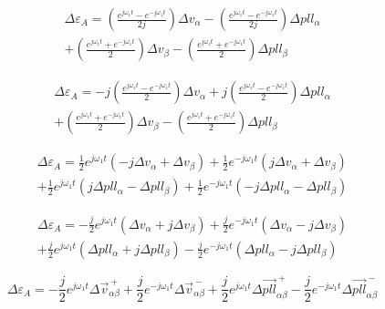 \documentclass[12pt,a4paper]{report}
\begin{document}
{

\color{blue}

\begin{multline}
\Delta\varepsilon_A =
\left(
\frac{e^{j\omega_1 t} - e^{-j\omega_1 t}}{2j}
\right) 
\Delta v_\alpha 
- \left(
\frac{e^{j\omega_1 t} - e^{-j\omega_1 t}}{2j}
\right)
\Delta pll_\alpha \\
+ \left(
\frac{e^{j\omega_1 t} + e^{-j\omega_1 t}}{2}
\right) 
\Delta v_\beta 
- \left(
\frac{e^{j\omega_1 t} + e^{-j\omega_1 t}}{2}
\right) 
\Delta pll_\beta
\end{multline}


\begin{multline}
\Delta\varepsilon_A =
-j\left(
\frac{e^{j\omega_1 t} - e^{-j\omega_1 t}}{2}
\right) 
\Delta v_\alpha 
+j \left(
\frac{e^{j\omega_1 t} - e^{-j\omega_1 t}}{2}
\right)
\Delta pll_\alpha \\
+ \left(
\frac{e^{j\omega_1 t} + e^{-j\omega_1 t}}{2}
\right) 
\Delta v_\beta 
- \left(
\frac{e^{j\omega_1 t} + e^{-j\omega_1 t}}{2}
\right) 
\Delta pll_\beta
\end{multline}


\begin{multline}
\Delta\varepsilon_A =
\frac{1}{2}
e^{j\omega_1 t}
( -j \Delta v_{\alpha}  + \Delta v_{\beta} )
+\frac{1}{2}
e^{-j\omega_1 t}
( j \Delta v_{\alpha}  + \Delta v_{\beta} )\\
+\frac{1}{2}
e^{j\omega_1 t}
( j\Delta pll_{\alpha}  -\Delta pll_{\beta} )
+\frac{1}{2}
e^{-j\omega_1 t}
( -j\Delta pll_{\alpha}  -\Delta pll_{\beta} )
\end{multline}

\begin{multline}
\Delta\varepsilon_A =
-\frac{j}{2}
e^{j\omega_1 t}
( \Delta v_{\alpha}  +j \Delta v_{\beta} )
+\frac{j}{2}
e^{-j\omega_1 t}
( \Delta v_{\alpha}  -j \Delta v_{\beta} )\\
+\frac{j}{2}
e^{j\omega_1 t}
( \Delta pll_{\alpha}  +j\Delta pll_{\beta} )
-\frac{j}{2}
e^{-j\omega_1 t}
( \Delta pll_{\alpha}  -j \Delta pll_{\beta} )
\end{multline}


}


\begin{equation}
\Delta\varepsilon_A =
-\frac{j}{2}
e^{j\omega_1 t}
\Delta \vec{v}_{\alpha\beta}^{~+}
+\frac{j}{2}
e^{-j\omega_1 t}
\Delta \vec{v}_{\alpha\beta}^{~-}
+\frac{j}{2}
e^{j\omega_1 t}
\Delta \vec{pll}_{\alpha\beta}^{~+}
-\frac{j}{2}
e^{-j\omega_1 t}
\Delta \vec{pll}_{\alpha\beta}^{~-}
\end{equation}
\end{document}
